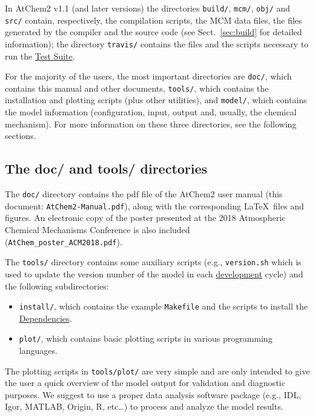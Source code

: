 In AtChem2 v1.1 (and later versions) the directories \texttt{build/},
\texttt{mcm/}, \texttt{obj/} and \texttt{src/} contain, respectively,
the compilation scripts, the MCM data files, the files generated by
the compiler and the source code (see Sect.~\ref{sec:build} for
detailed information); the directory \texttt{travis/} contains the
files and the scripts necessary to run the \hyperref[sec:test-suite]{Test Suite}.

For the majority of the users, the most important directories are
\texttt{doc/}, which contains this manual and other documents,
\texttt{tools/}, which contains the installation and plotting scripts
(plus other utilities), and \texttt{model/}, which contains the model
information (configuration, input, output and, usually, the chemical
mechanism). For more information on these three directories, see the
following sections.

\subsection{The doc/ and tools/ directories} \label{subsec:doc-tools-directories}

The \texttt{doc/} directory contains the pdf file of the AtChem2 user
manual (this document: \texttt{AtChem2-Manual.pdf}), along with the
corresponding \LaTeX\ files and figures. An electronic copy of the
poster presented at the 2018 Atmospheric Chemical Mechanisms
Conference \citep{sommariva_2018} is also included
(\texttt{AtChem\_poster\_ACM2018.pdf}).

The \texttt{tools/} directory contains some auxiliary scripts (e.g.,
\texttt{version.sh} which is used to update the version number of the
model in each \hyperref[ch:development]{development} cycle) and the
following subdirectories:

\begin{itemize}
\item \texttt{install/}, which contains the example \texttt{Makefile}
  and the scripts to install the \hyperref[sec:dependencies]{Dependencies}.
\item \texttt{plot/}, which contains basic plotting scripts in various
  programming languages.
\end{itemize}

The plotting scripts in \texttt{tools/plot/} are very simple and are
only intended to give the user a quick overview of the model output
for validation and diagnostic purposes. We suggest to use a proper
data analysis software package (e.g., IDL, Igor, MATLAB, Origin, R,
etc\ldots) to process and analyze the model results.

